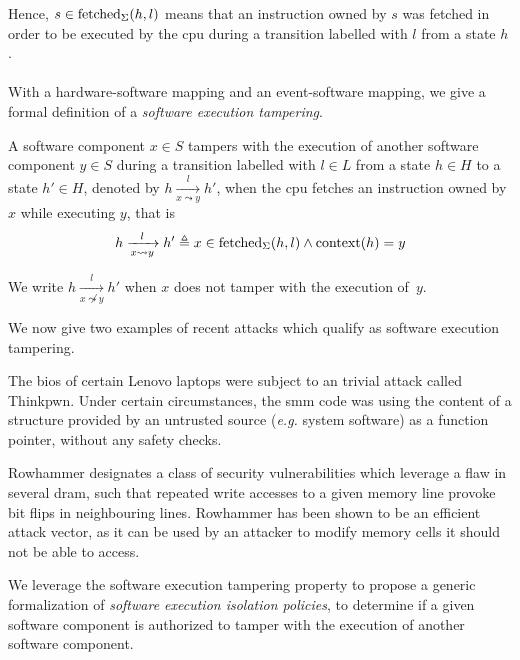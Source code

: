 Hence, $s \in \mathrm{fetched}_{\Sigma}(h, l)$ means that an instruction owned by
$s$ was fetched in order to be executed by the \ac{cpu} during a transition
labelled with $l$ from a state $h$.

\paragraph{}
%
With a hardware-software mapping and an event-software mapping, we give a formal
definition of a \textit{software execution tampering}.

\begin{definition}
  \label{def:codeinjection}
  A software component $x \in S$ tampers with the execution of another software
  component $y \in S$ during a transition labelled with $l \in L$ from a state
  $h \in H$ to a state $h' \in H$, denoted by
  $h \xrightarrow[x \leadsto y]{l} h'$, when the \ac{cpu} fetches an instruction
  owned by $x$ while executing $y$, that is
  \[
    h \xrightarrow[x \leadsto y]{l} h' \triangleq x \in
    \mathrm{fetched}_{\Sigma}(h, l) \wedge \mathrm{context}(h) = y
  \]

  We write $h \xrightarrow[x \not\leadsto y]{l} h'$ when $x$ does not tamper
  with the execution of~$y$.
\end{definition}

We now give two examples of recent attacks which qualify as software execution
tampering.

\begin{example}[Thinkpwn]
  The \ac{bios} of certain Lenovo laptops were subject to an trivial attack
  called Thinkpwn.
  Under certain circumstances, the \ac{smm} code was using the content of a
  structure provided by an untrusted source (\emph{e.g.} system software) as a
  function pointer, without any safety checks.
\end{example}

\begin{example}[Rowhammer]
  Rowhammer designates a class of security vulnerabilities which leverage a flaw
  in several \ac{dram}, such that repeated write accesses to a given memory line
  provoke bit flips in neighbouring lines.
  Rowhammer has been shown to be an efficient attack vector, as it can be used
  by an attacker to modify memory cells it should not be able to access.
\end{example}

We leverage the software execution tampering property to propose a generic
formalization of \emph{software execution isolation policies}, to determine if a
given software component is authorized to tamper with the execution of another
software component.

